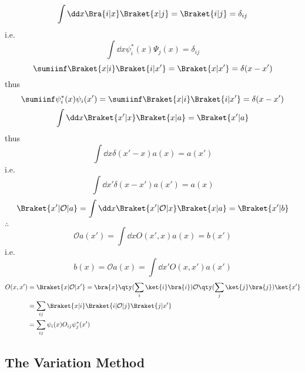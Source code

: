 \documentclass[a4paper]{article}
\begin{document}
\begin{equation}\label{key}
\int\dd x \Bra{i|x}\Braket{x|j} = \Braket{i|j} = \delta_{ij}
\end{equation}
i.e.
\begin{equation}\label{key}
\int\dd x \psi_i^*(x)\Psi_j(x) = \delta_{ij}
\end{equation}
\begin{equation}\label{key}
\sumiinf \Braket{x|i}\Braket{i|x'} = \Braket{x|x'} = \delta(x-x')
\end{equation}
thus
\begin{equation}\label{key}
 \sumiinf \psi_i^*(x)\psi_i(x') = \sumiinf \Braket{x|i}\Braket{i|x'} = \delta(x-x')
\end{equation}
\begin{equation}\label{key}
\int\dd x \Braket{x'|x}\Braket{x|a} = \Braket{x'|a}
\end{equation}
thus
\begin{equation}\label{key}
\int\dd x \delta(x' - x) a(x) = a(x')
\end{equation}
i.e.
\begin{equation}\label{key}
\int\dd x' \delta(x-x')a(x') = a(x)
\end{equation}
\begin{equation}\label{key}
\Braket{x' | \mathcal{O} | a} = \int\dd x \Braket{x' | \mathcal{O} | x} \Braket{x|a} = \Braket{x'|b}
\end{equation}
$ \therefore $
\begin{equation}\label{key}
\mathcal{O}a(x') = \int\dd x O(x',x)a(x) = b(x')
\end{equation}
i.e.
\begin{equation}\label{key}
b(x) = \mathcal{O}a(x) = \int\dd x' O(x,x')a(x')
\end{equation}
\begin{equation}\label{key}
\begin{aligned}
O(x,x') &= \Braket{x | \mathcal{O} | x'} = \bra{x} \qty(\sum_i \ket{i}\bra{i}) \mathcal{O} \qty(\sum_j\ket{j}\bra{j}) \ket{x'}\\
&= \sum_{ij} \Braket{x|i}\Braket{i | \mathcal{O} | j} \Braket{j|x'}\\
&= \sum_{ij} \psi_i(x) O_{ij} \psi_j^*(x')
\end{aligned}
\end{equation}

\subsection{The Variation Method}
\end{document}
